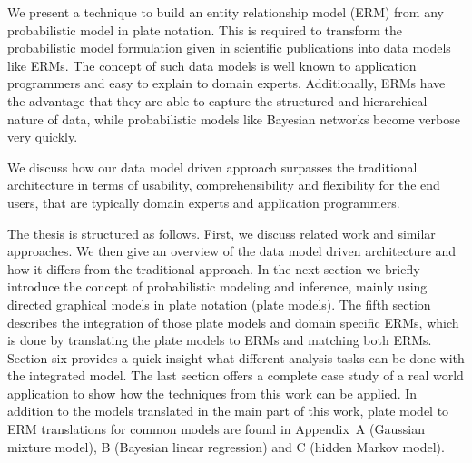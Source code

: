 We present a technique to build an entity relationship model (ERM) from any probabilistic model in plate notation. This is required to transform the probabilistic model formulation given in scientific publications into data models like ERMs. The concept of such data models is well known to application programmers and easy to explain to domain experts. Additionally, ERMs have the advantage that they are able to capture the structured and hierarchical nature of data, while probabilistic models like Bayesian networks become verbose very quickly.

We discuss how our data model driven approach surpasses the traditional architecture in terms of usability, comprehensibility and flexibility for the end users, that are typically domain experts and application programmers.

The thesis is structured as follows. First, we discuss related work and similar approaches. We then give an overview of the data model driven architecture and how it differs from the traditional approach. In the next section we briefly introduce the concept of probabilistic modeling and inference, mainly using directed graphical models in plate notation (plate models). The fifth section describes the integration of those plate models and domain specific ERMs, which is done by translating the plate models to ERMs and matching both ERMs. Section six provides a quick insight what different analysis tasks can be done with the integrated model. The last section offers a complete case study of a real world application to show how the techniques from this work can be applied. In addition to the models translated in the main part of this work, plate model to ERM translations for common models are found in Appendix~A (Gaussian mixture model), B (Bayesian linear regression) and C (hidden Markov model).
